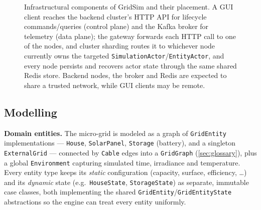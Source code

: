 \documentclass{scrreprt}
\begin{document}
\begin{figure}[H]
\caption{Infrastructural components of GridSim and their placement. A GUI client reaches the
backend cluster's HTTP API for lifecycle commands/queries (control plane) and the Kafka broker
for telemetry (data plane); the gateway forwards each HTTP call to one of the nodes, and cluster sharding routes it to whichever node currently
owns the targeted \texttt{SimulationActor}/\texttt{EntityActor}, and every node persists and
recovers actor state through the same shared Redis store. Backend nodes, the broker and Redis
are expected to share a trusted network, while GUI clients may be remote.}
\label{fig:infrastructure-components}
\end{figure}

\subsection{Modelling}\label{modelling}

\textbf{Domain entities.} The micro-grid is modeled as a graph of \texttt{GridEntity}
implementations --- \texttt{House}, \texttt{SolarPanel}, \texttt{Storage} (battery), and a
singleton \texttt{ExternalGrid} --- connected by \texttt{Cable} edges into a \texttt{GridGraph}
(\cref{sec:glossary}), plus a global \texttt{Environment} capturing simulated time, irradiance
and temperature. Every entity type keeps its \emph{static} configuration (capacity, surface,
efficiency, \ldots) and its \emph{dynamic} state (e.g.\ \texttt{HouseState},
\texttt{StorageState}) as separate, immutable case classes, both implementing the shared
\texttt{GridEntity}/\texttt{GridEntityState} abstractions so the engine can treat every entity
uniformly.
\end{document}
